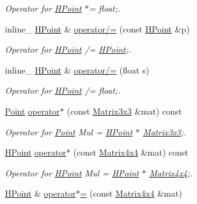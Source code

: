 \begin{DoxyCompactItemize}
\begin{DoxyCompactList}\small\item\em Operator for \hyperlink{classHPoint}{H\+Point} $\ast$= float;. \end{DoxyCompactList}\item 
inline\+\_\+ \hyperlink{classHPoint}{H\+Point} \& \hyperlink{classHPoint_a6f344d8b5dafa320336651cd8373d184}{operator/=} (const \hyperlink{classHPoint}{H\+Point} \&p)\hypertarget{classHPoint_a6f344d8b5dafa320336651cd8373d184}{}\label{classHPoint_a6f344d8b5dafa320336651cd8373d184}

\begin{DoxyCompactList}\small\item\em Operator for \hyperlink{classHPoint}{H\+Point} /= \hyperlink{classHPoint}{H\+Point};. \end{DoxyCompactList}\item 
inline\+\_\+ \hyperlink{classHPoint}{H\+Point} \& \hyperlink{classHPoint_aedac2fd0b37b024b932760c2b2df8f21}{operator/=} (float s)\hypertarget{classHPoint_aedac2fd0b37b024b932760c2b2df8f21}{}\label{classHPoint_aedac2fd0b37b024b932760c2b2df8f21}

\begin{DoxyCompactList}\small\item\em Operator for \hyperlink{classHPoint}{H\+Point} /= float;. \end{DoxyCompactList}\item 
\hyperlink{classPoint}{Point} \hyperlink{classHPoint_a530bbf4cc9ab6469b64613cfeb7360b6}{operator$\ast$} (const \hyperlink{classMatrix3x3}{Matrix3x3} \&mat) const \hypertarget{classHPoint_a530bbf4cc9ab6469b64613cfeb7360b6}{}\label{classHPoint_a530bbf4cc9ab6469b64613cfeb7360b6}

\begin{DoxyCompactList}\small\item\em Operator for \hyperlink{classPoint}{Point} Mul = \hyperlink{classHPoint}{H\+Point} $\ast$ \hyperlink{classMatrix3x3}{Matrix3x3};. \end{DoxyCompactList}\item 
\hyperlink{classHPoint}{H\+Point} \hyperlink{classHPoint_a58fccab708209221cd88ebd4f1c7e8c2}{operator$\ast$} (const \hyperlink{classMatrix4x4}{Matrix4x4} \&mat) const \hypertarget{classHPoint_a58fccab708209221cd88ebd4f1c7e8c2}{}\label{classHPoint_a58fccab708209221cd88ebd4f1c7e8c2}

\begin{DoxyCompactList}\small\item\em Operator for \hyperlink{classHPoint}{H\+Point} Mul = \hyperlink{classHPoint}{H\+Point} $\ast$ \hyperlink{classMatrix4x4}{Matrix4x4};. \end{DoxyCompactList}\item 
\hyperlink{classHPoint}{H\+Point} \& \hyperlink{classHPoint_a731f66ee1919e3b0d5f944bd7f9e3f28}{operator$\ast$=} (const \hyperlink{classMatrix4x4}{Matrix4x4} \&mat)\hypertarget{classHPoint_a731f66ee1919e3b0d5f944bd7f9e3f28}{}\label{classHPoint_a731f66ee1919e3b0d5f944bd7f9e3f28}


\end{DoxyCompactItemize}

